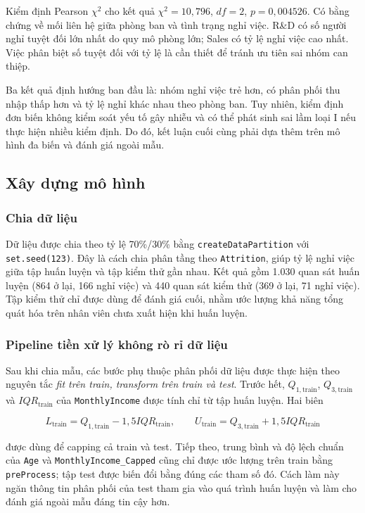 Kiểm định Pearson \(\chi^2\) cho kết quả
\(\chi^2=10{,}796\), \(df=2\), \(p=0{,}004526\). Có bằng chứng về mối
liên hệ giữa phòng ban và tình trạng nghỉ việc. R\&D có số người nghỉ
tuyệt đối lớn nhất do quy mô phòng lớn; Sales có tỷ lệ nghỉ việc cao
nhất. Việc phân biệt số tuyệt đối với tỷ lệ là cần thiết để tránh ưu
tiên sai nhóm can thiệp.

Ba kết quả định hướng ban đầu là: nhóm nghỉ việc trẻ hơn, có phân phối
thu nhập thấp hơn và tỷ lệ nghỉ khác nhau theo phòng ban. Tuy nhiên,
kiểm định đơn biến không kiểm soát yếu tố gây nhiễu và có thể phát sinh
sai lầm loại I nếu thực hiện nhiều kiểm định. Do đó, kết luận cuối cùng
phải dựa thêm trên mô hình đa biến và đánh giá ngoài mẫu.

\subsection{Xây dựng mô hình}

\subsubsection{Chia dữ liệu}

Dữ liệu được chia theo tỷ lệ 70\%/30\% bằng
\texttt{createDataPartition} với \texttt{set.seed(123)}. Đây là cách
chia phân tầng theo \texttt{Attrition}, giúp tỷ lệ nghỉ việc giữa tập
huấn luyện và tập kiểm thử gần nhau. Kết quả gồm 1.030 quan sát huấn
luyện (864 ở lại, 166 nghỉ việc) và 440 quan sát kiểm thử (369 ở lại,
71 nghỉ việc). Tập kiểm thử chỉ được dùng để đánh
giá cuối, nhằm ước lượng khả năng tổng quát hóa trên nhân viên chưa xuất
hiện khi huấn luyện.

\subsubsection{Pipeline tiền xử lý không rò rỉ dữ liệu}
\label{sec:hr-strict-pipeline}

Sau khi chia mẫu, các bước phụ thuộc phân phối dữ liệu được thực hiện
theo nguyên tắc \emph{fit trên train, transform trên train và test}.
Trước hết, \(Q_{1,\mathrm{train}}\), \(Q_{3,\mathrm{train}}\) và
\(IQR_{\mathrm{train}}\) của \texttt{MonthlyIncome} được tính chỉ từ
tập huấn luyện. Hai biên

\[
L_{\mathrm{train}}=Q_{1,\mathrm{train}}-1{,}5IQR_{\mathrm{train}},
\qquad
U_{\mathrm{train}}=Q_{3,\mathrm{train}}+1{,}5IQR_{\mathrm{train}}
\]

được dùng để capping cả train và test. Tiếp theo, trung bình và độ lệch
chuẩn của \texttt{Age} và \texttt{MonthlyIncome\_Capped} cũng chỉ được
ước lượng trên train bằng \texttt{preProcess}; tập test được biến đổi
bằng đúng các tham số đó. Cách làm này ngăn thông tin phân phối của test
tham gia vào quá trình huấn luyện và làm cho đánh giá ngoài mẫu đáng tin
cậy hơn.


